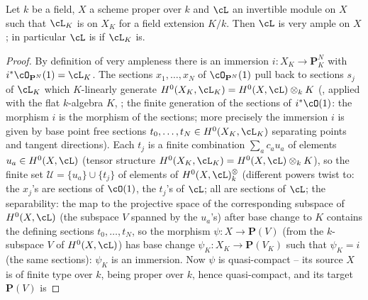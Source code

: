 \begin{lemma}
\label{lem:pc-very-ample-descends}
Let $k$ be a field, $X$ a scheme proper over $k$ and $\cL$ an
invertible module on $X$ such that $\cL_K$ is
 on $X_K$ for a field extension
$K/k$.  Then $\cL$ is very ample on $X$; in particular $\cL$ is
 if $\cL_K$ is.
\end{lemma}
\begin{proof}
By definition of very ampleness there is an immersion
$i:X_K\to\mathbf P^N_K$ with $i^*\cO_{\mathbf P^N}(1)=\cL_K$.  The
sections $x_1,\dots,x_N$ of $\cO_{\mathbf P^N}(1)$ pull back to
sections $s_j$ of $\cL_K$ which $K$-linearly generate
$H^0(X_K,\cL_K)=H^0(X,\cL)\otimes_kK$
(, applied with the flat
$k$-algebra $K$, ; the finite generation of the
sections of $i^*\cO(1)$: the morphism $i$ is the morphism of the
sections; more precisely the immersion $i$ is given by base point free
sections $t_0,\dots,t_N\in H^0(X_K,\cL_K)$ separating points and
tangent directions).  Each $t_j$ is a finite combination
$\sum_ac_a u_a$ of elements $u_a\in H^0(X,\cL)$ (tensor structure
$H^0(X_K,\cL_K)=H^0(X,\cL)\otimes_kK$), so the finite set
$\mathcal U=\{u_a\}\cup\{t_j\}$ of elements of $H^0(X,\cL)^{\otimes}_k$
(different powers twist to: the $x_j$'s are sections of
$\cO(1)$, the $t_j$'s of $\cL$; all are sections of $\cL$; the
separability: the map to the projective space of the corresponding
subspace of $H^0(X,\cL)$ (the subspace $V$ spanned by the $u_a$'s)
after base change to $K$ contains the defining sections
$t_0,\dots,t_N$, so the morphism
$\psi:X\to\mathbf P(V)$ (from the $k$-subspace $V$ of $H^0(X,\cL)$)
has base change $\psi_K:X_K\to\mathbf P(V_K)$ such that $\psi_K=i$
(the same sections): $\psi_K$ is an immersion.  Now $\psi$ is
quasi-compact -- its source $X$ is of finite type over $k$, being
proper over $k$, hence quasi-compact, and its target $\mathbf P(V)$ is

\end{proof}
